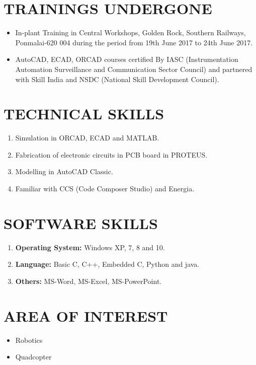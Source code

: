 \documentclass[margin,line]{res}
\begin{document}
\begin{resume}
\section{\sc TRAININGS UNDERGONE}
\begin{itemize}
\item In-plant Training in Central Workshops, Golden Rock, Southern Railways, Ponmalai-620 004 during the period from 19th June 2017 to 24th June 2017.\\
\item AutoCAD, ECAD, ORCAD courses certified By IASC (Instrumentation Automation Surveillance and Communication Sector Council) and partnered with Skill India and NSDC (National Skill Development Council).\\
\end{itemize}

\section{\sc TECHNICAL SKILLS}
\begin{enumerate}
\item Simulation in ORCAD, ECAD and MATLAB.\\
\item Fabrication of electronic circuits in PCB board in PROTEUS.\\
\item Modelling in AutoCAD Classic.\\
\item Familiar with CCS (Code Composer Studio) and Energia.\\
\end{enumerate}

\section{\sc SOFTWARE SKILLS}
\begin{enumerate}
\item \textbf{Operating System:} Windows XP, 7, 8 and 10.
\item \textbf{Language:} Basic C, C++, Embedded C, Python and java.
\item  \textbf{Others:} MS-Word, MS-Excel, MS-PowerPoint.
\end{enumerate}

\section{\sc AREA OF INTEREST}
\begin{itemize}
\item Robotics
\item Quadcopter
\end{itemize}



\end{resume}
\end{document}
